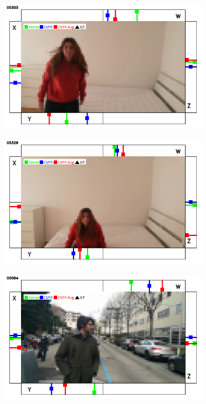 \begin{figure}[H]
\begin{center}
\begin{subfigure}[h]{0.49\textwidth}
		\end{subfigure}
		\vfill
		\begin{subfigure}[h]{0.49\textwidth}
			\centering
			\includegraphics[width=0.98\textwidth]{"contents/images/qualitative-videos/perfect2-house01-5303"}
		\end{subfigure}
		\hfill
		\begin{subfigure}[h]{0.49\textwidth}
			\centering
			\includegraphics[width=0.98\textwidth]{"contents/images/qualitative-videos/perfect2-house01-5329"}
		\end{subfigure}
		\vfill
		\begin{subfigure}[h]{0.49\textwidth}
			\centering
			\includegraphics[width=0.98\textwidth]{"contents/images/qualitative-videos/perfect3-street01-64"}

\end{subfigure}
\end{center}
\end{figure}
